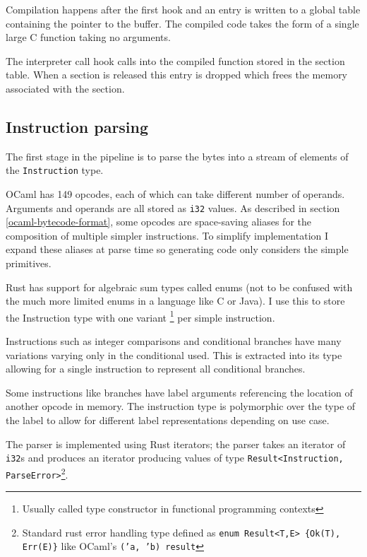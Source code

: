 Compilation happens after the first hook and an entry is written to a global table containing the
pointer to the buffer. The compiled code takes the form of a single large C function taking no
arguments.

The interpreter call hook calls into the compiled function stored in the section table.  When a
section is released this entry is dropped which frees the memory associated with the section.

\subsection{Instruction parsing}

The first stage in the pipeline is to parse the bytes into a stream of elements of the
\texttt{Instruction} type.

\label{instruction-type}

OCaml has 149 opcodes, each of which can take different number of operands. Arguments and operands
are all stored as \texttt{i32} values. As described in section \ref{ocaml-bytecode-format}, some
opcodes
are space-saving aliases for the composition of multiple simpler instructions. To simplify
implementation
I expand these aliases at parse time so generating code only considers the simple primitives.

Rust has support for algebraic sum types called enums (not to be confused with the much more
limited
enums in a language like C or Java). I use this to store the Instruction type with one variant
\footnote{Usually called type constructor in functional programming contexts} per simple
instruction.

Instructions such as integer comparisons and conditional branches have many variations varying only
in the conditional used. This is extracted into its type allowing for a single instruction to
represent
all conditional branches.

Some instructions like branches have label arguments referencing the location of another opcode in
memory. The instruction type is polymorphic over the type of the label to allow for different label
representations depending on use case.


The parser is implemented using Rust iterators; the parser takes an iterator of \texttt{i32}s and
produces an iterator producing values of type \texttt{Result<Instruction,
      ParseError>}\footnote{Standard rust error handling type defined as \texttt{enum Result<T,E>
            \{Ok(T), Err(E)\}} like OCaml's \texttt{('a, 'b) result}}.

